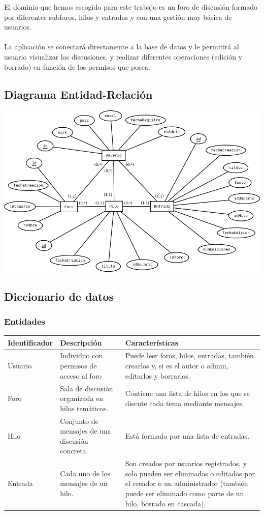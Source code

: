 \documentclass[12pt, a4paper, titlepage]{article}
\begin{document}
El dominio que hemos escogido para este trabajo es un foro de discusión formado por diferentes subforos, hilos y entradas y con una gestión muy básica de usuarios.
\paragraph{}
La aplicación se conectará directamente a la base de datos y le permitirá al usuario visualizar las discusiones, y realizar diferentes operaciones (edición y borrado) en función de los permisos que posea.

\subsection{Diagrama Entidad-Relación}

\includegraphics[width=15cm]{./img/er.png}

\subsection{Diccionario de datos}

\subsubsection{Entidades}

\begin{longtable}{|p{3cm}|p{4cm}|p{6cm}|}
	\hline
	\textbf{Identificador} & \textbf{Descripción} & \textbf{Características} \\ \hline
	\endhead
	Usuario & Individuo con permisos de acceso al foro & Puede leer foros, hilos, entradas, también crearlos y, si es el autor o admin, editarlos y borrarlos. \\ \hline
	Foro & Sala de discusión organizada en hilos temáticos. & Contiene una lista de hilos en los que se discute cada tema mediante mensajes. \\ \hline
	Hilo & Conjunto de mensajes de una discusión concreta. & Está formado por una lista de entradas. \\ \hline
	Entrada & Cada uno de los mensajes de un hilo. & Son creados por usuarios registrados, y solo pueden ser eliminados o editados por el creador o un administrador (también puede ser eliminado como parte de un hilo, borrado en cascada). \\ \hline
\end{longtable}
\end{document}
